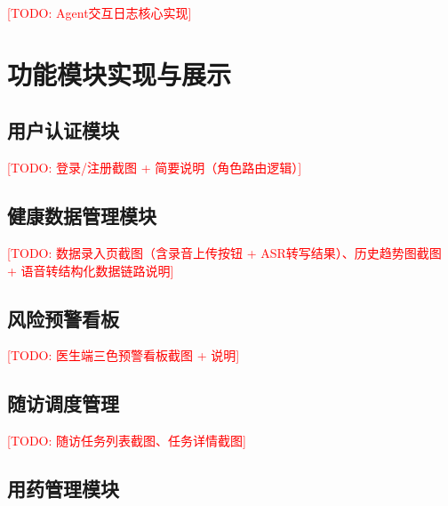 \textcolor{red}{[TODO: Agent交互日志核心实现]}



\section{功能模块实现与展示}

\subsection{用户认证模块}

\textcolor{red}{[TODO: 登录/注册截图 + 简要说明（角色路由逻辑）]}

\subsection{健康数据管理模块}

\textcolor{red}{[TODO: 数据录入页截图（含录音上传按钮 + ASR转写结果）、历史趋势图截图 + 语音转结构化数据链路说明]}

\subsection{风险预警看板}

\textcolor{red}{[TODO: 医生端三色预警看板截图 + 说明]}

\subsection{随访调度管理}

\textcolor{red}{[TODO: 随访任务列表截图、任务详情截图]}

\subsection{用药管理模块}

